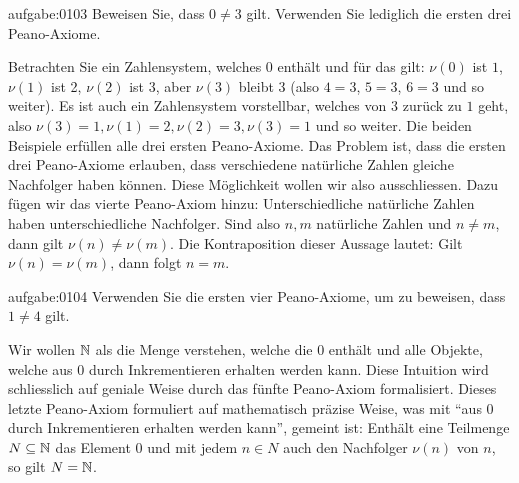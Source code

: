 \begin{aufgabe}{aufgabe:0103}
{Beweisen Sie, dass $0\neq 3$ gilt. Verwenden Sie lediglich die ersten drei Peano-Axiome.}
\end{aufgabe}
\noindent
Betrachten Sie ein Zahlensystem, welches $0$ enthält und für das gilt: $\nu(0)$ ist $1$, $\nu(1)$ ist 2, $\nu(2)$ ist $3$, aber $\nu(3)$ bleibt $3$ (also $4=3$, $5=3$, $6=3$ und so weiter). Es ist auch ein Zahlensystem vorstellbar, welches von $3$ zurück zu $1$ geht, also $\nu(3)=1, \nu(1)=2, \nu(2)=3, \nu(3)=1$ und so weiter. Die beiden Beispiele erfüllen alle drei ersten Peano-Axiome. Das Problem ist, dass die ersten drei Peano-Axiome erlauben, dass verschiedene natürliche Zahlen gleiche Nachfolger haben können. Diese Möglichkeit wollen wir also ausschliessen. Dazu fügen wir das vierte Peano-Axiom hinzu:
{Unterschiedliche natürliche Zahlen haben unterschiedliche Nachfolger. Sind also $n,m$ natürliche Zahlen und $n\neq m$, dann gilt $\nu(n)\neq\nu(m)$. Die Kontraposition dieser Aussage lautet: Gilt $\nu(n)=\nu(m)$, dann folgt $n=m$.}
\begin{aufgabe}{aufgabe:0104}
{Verwenden Sie die ersten vier Peano-Axiome, um zu beweisen, dass $1\neq 4$ gilt.}
\end{aufgabe}
\noindent
Wir wollen $\mathbb{N}$ als die Menge verstehen, welche die $0$ enthält und alle Objekte, welche aus $0$ durch Inkrementieren erhalten werden kann. Diese Intuition wird schliesslich auf geniale Weise durch das fünfte Peano-Axiom formalisiert. Dieses letzte Peano-Axiom formuliert auf mathematisch präzise Weise, was mit \enquote{aus $0$ durch Inkrementieren erhalten werden kann}, gemeint ist:
{Enthält eine Teilmenge $N\subseteq\mathbb{N}$ das Element $0$ und mit jedem $n\in N$ auch den Nachfolger $\nu(n)$ von $n$, so gilt $N=\mathbb{N}$.}

